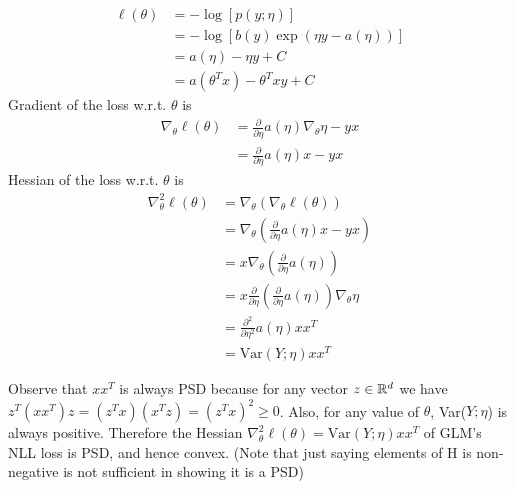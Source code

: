 \begin{answer}
  \begin{align*}
    \ell(\theta) &= - \log \left[p(y;\eta)\right] \\
    &= - \log\left[b(y)\exp(\eta y - a(\eta))\right] \\
    &= a(\eta) - \eta y + C \\
    &= a(\theta^T x) - \theta^Txy + C
  \end{align*}
  Gradient of the loss w.r.t. $\theta$ is
  \begin{align*}
\nabla_\theta \ell(\theta) &= \frac{\partial}{\partial \eta}a(\eta)
\nabla_\theta \eta - yx \\
        &=\frac{\partial}{\partial \eta}a(\eta) x - yx
    \end{align*}
    Hessian of the loss w.r.t. $\theta$ is
    \begin{align*}
\nabla_\theta^2 \ell(\theta) &= \nabla_\theta \left( \nabla_\theta \ell(\theta)
\right) \\
&= \nabla_\theta \left( \frac{\partial}{\partial \eta}a(\eta) x - yx  \right) \\
&=x\nabla_\theta \left( \frac{\partial}{\partial \eta}a(\eta)  \right) \\
&= x \frac{\partial}{\partial \eta}\left( \frac{\partial}{\partial \eta}a(\eta)
\right) \nabla_\theta \eta \\
        &= \frac{\partial^2}{\partial \eta^2}a(\eta) xx^T \\
        &= \text{Var}(Y; \eta) xx^T
    \end{align*}

Observe that $xx^T$ is always PSD because for any vector $z \in \mathbb{R}^{d}$ we have $z^T(xx^T)z = (z^Tx)(x^Tz) = (z^Tx)^2 \ge 0$.
Also, for any value of $\theta$, Var($Y; \eta$) is always positive. Therefore the
Hessian $\nabla_\theta^2 \ell(\theta) = \text{Var}(Y; \eta) xx^T$ of GLM's
NLL loss is PSD, and hence convex. (Note that just saying elements of H is non-negative is not sufficient in showing it is a PSD)
\end{answer}
